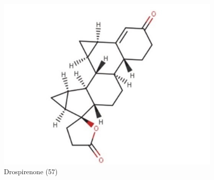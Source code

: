 \begin{itemize}[label={$\bullet$}, align=right]
\begin{figure}[H]
    \includegraphics{Images/fig_31.jpg}
    \caption{Drospirenone (57)}
  \end{figure}


\end{itemize}

